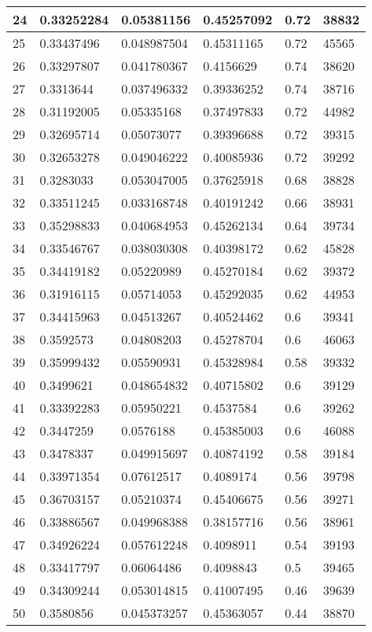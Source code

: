 \begin{longtable}{|l|l|l|l|l|l|}
24 & 0.33252284 & 0.05381156 & 0.45257092 & 0.72 & 38832 \\ \hline 
25 & 0.33437496 & 0.048987504 & 0.45311165 & 0.72 & 45565 \\ \hline 
26 & 0.33297807 & 0.041780367 & 0.4156629 & 0.74 & 38620 \\ \hline 
27 & 0.3313644 & 0.037496332 & 0.39336252 & 0.74 & 38716 \\ \hline 
28 & 0.31192005 & 0.05335168 & 0.37497833 & 0.72 & 44982 \\ \hline 
29 & 0.32695714 & 0.05073077 & 0.39396688 & 0.72 & 39315 \\ \hline 
30 & 0.32653278 & 0.049046222 & 0.40085936 & 0.72 & 39292 \\ \hline 
31 & 0.3283033 & 0.053047005 & 0.37625918 & 0.68 & 38828 \\ \hline 
32 & 0.33511245 & 0.033168748 & 0.40191242 & 0.66 & 38931 \\ \hline 
33 & 0.35298833 & 0.040684953 & 0.45262134 & 0.64 & 39734 \\ \hline 
34 & 0.33546767 & 0.038030308 & 0.40398172 & 0.62 & 45828 \\ \hline 
35 & 0.34419182 & 0.05220989 & 0.45270184 & 0.62 & 39372 \\ \hline 
36 & 0.31916115 & 0.05714053 & 0.45292035 & 0.62 & 44953 \\ \hline 
37 & 0.34415963 & 0.04513267 & 0.40524462 & 0.6 & 39341 \\ \hline 
38 & 0.3592573 & 0.04808203 & 0.45278704 & 0.6 & 46063 \\ \hline 
39 & 0.35999432 & 0.05590931 & 0.45328984 & 0.58 & 39332 \\ \hline 
40 & 0.3499621 & 0.048654832 & 0.40715802 & 0.6 & 39129 \\ \hline 
41 & 0.33392283 & 0.05950221 & 0.4537584 & 0.6 & 39262 \\ \hline 
42 & 0.3447259 & 0.0576188 & 0.45385003 & 0.6 & 46088 \\ \hline 
43 & 0.3478337 & 0.049915697 & 0.40874192 & 0.58 & 39184 \\ \hline 
44 & 0.33971354 & 0.07612517 & 0.4089174 & 0.56 & 39798 \\ \hline 
45 & 0.36703157 & 0.05210374 & 0.45406675 & 0.56 & 39271 \\ \hline 
46 & 0.33886567 & 0.049968388 & 0.38157716 & 0.56 & 38961 \\ \hline 
47 & 0.34926224 & 0.057612248 & 0.4098911 & 0.54 & 39193 \\ \hline 
48 & 0.33417797 & 0.06064486 & 0.4098843 & 0.5 & 39465 \\ \hline 
49 & 0.34309244 & 0.053014815 & 0.41007495 & 0.46 & 39639 \\ \hline 
50 & 0.3580856 & 0.045373257 & 0.45363057 & 0.44 & 38870 \\ \hline 
\end{longtable}